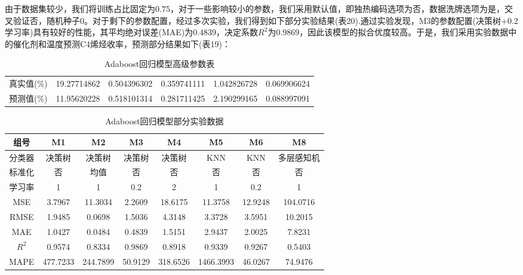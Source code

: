 \documentclass[withoutpreface,bwprint]{cumcmthesis} %
\begin{document}
由于数据集较少，我们将训练占比固定为$0.75$，对于一些影响较小的参数，我们采用默认值，即独热编码选项为否，数据洗牌选项为是，交叉验证否，随机种子0。对于剩下的参数配置，经过多次实验，我们得到如下部分实验结果(表20).通过实验发现，M3的参数配置(决策树+0.2学习率)具有较好的性能，其平均绝对误差(MAE)为0.4839，决定系数$R^2$为0.9869，因此该模型的拟合优度较高。于是，我们采用实验数据中的催化剂和温度预测C4烯烃收率，预测部分结果如下(表19)：
\begin{table}[!htbp]
	\caption{Adaboost回归模型高级参数表}\label{tab:001} \centering
	\begin{tabular}{cccccc}
		\toprule[1.5pt]
		真实值(\%)& 19.27714862
		& 0.504396302
		& 0.359741111
		& 1.042826728
		& 0.069906624
		\\
		预测值(\%) &  11.95620228
		& 0.518101314
		&   0.281711425
		& 2.190299165
		&
		0.088997091
		\\
		\bottomrule[1.5pt]	
	\end{tabular}
\end{table}


\begin{table}[!htbp]
	\caption{Adaboost回归模型部分实验数据}\label{tab:001} \centering
	\begin{tabular}{cccccccc}
		\toprule[1.5pt]
		组号 & M1 & M2 & M3 & M4 & M5 & M6 & M8 \\
		\midrule[1pt]
		分类器& 决策树 & 决策树 &  决策树 & 决策树 & KNN & KNN & 多层感知机 \\
		标准化&  否 & 均值 &  否 & 否 & 否 & 否 & 否 \\
		学习率 &  1 & 1 &  0.2 & 2 & 1 & 0.2  & 1  \\
		MSE & 3.7967
		 & 11.3034
		  &  2.2609
		   & 18.6175
		    & 11.3758
		    & 12.9248
		      & 104.0716
		         \\
		RMSE &  1.9485
		 & 0.0698
		  &  1.5036
		  & 4.3148
		   & 3.3728
		   & 3.5951
		     & 10.2015
		        \\
		MAE &  1.0427
		 & 0.0484
		  &  0.4839
		   & 1.5151
		    & 2.9437
		     & 2.0025
		       & 7.8231
		          \\
		$R^2$ &  0.9574
		 & 0.8334
		  &  0.9869
		  &0.8918
		   & 0.9339
		    & 0.9267
		      &0.5403
		         \\
		MAPE &  477.7233
		 & 244.7899
		  &  50.9129
		   & 318.6526
		    & 1466.3993
		     & 46.0267
		       &74.9476
		         \\
		\bottomrule[1.5pt]	
	\end{tabular}
\end{table}
\end{document}
